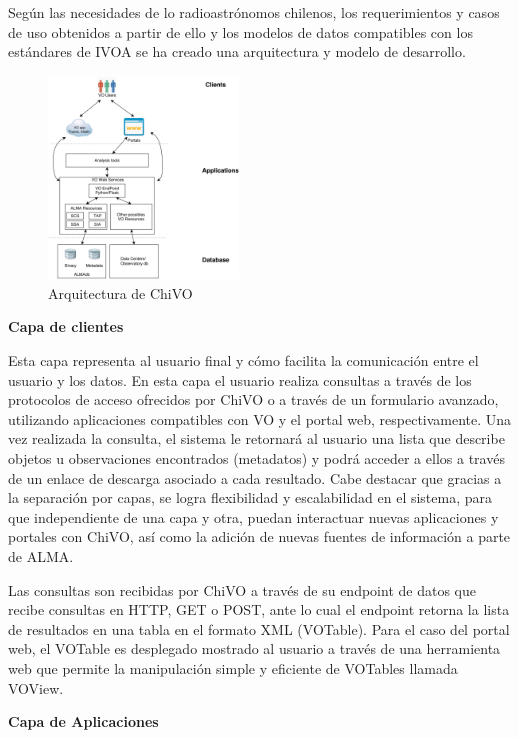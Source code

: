 Según las necesidades de lo radioastrónomos chilenos, los requerimientos y casos de
uso obtenidos a partir de ello y los modelos de datos compatibles con los estándares
de IVOA se ha creado una arquitectura y modelo de desarrollo.

\begin{figure}[h]
    \centering
    \includegraphics[width=0.45\textwidth]{images/chivo_capas.png}
    \caption{Arquitectura de ChiVO}
    \label{fig:chivoarch}
\end{figure}

\textbf{Capa de clientes}

Esta capa representa al usuario final y cómo facilita la comunicación entre el
usuario y los datos.
En esta capa el usuario realiza consultas a través de los protocolos de acceso
ofrecidos por ChiVO o a través de un formulario avanzado, utilizando aplicaciones
compatibles con VO y el portal web, respectivamente.
Una vez realizada la consulta, el sistema le retornará al usuario una lista que
describe objetos u observaciones encontrados (metadatos) y podrá acceder a ellos a
través de un enlace de descarga asociado a cada resultado.
Cabe destacar que gracias a la separación por capas, se logra flexibilidad y
escalabilidad en el sistema, para que independiente de una capa y otra, puedan
interactuar nuevas aplicaciones y portales con ChiVO, así como la adición de nuevas
fuentes de información a parte de ALMA.

Las consultas son recibidas por ChiVO a través de su endpoint de datos que recibe
consultas en HTTP, GET o POST, ante lo cual el endpoint retorna la lista de
resultados en una tabla en el formato XML (VOTable).
Para el caso del portal web, el VOTable es desplegado mostrado al usuario a través
de una herramienta web que permite la manipulación simple y eficiente de VOTables
llamada VOView.

\textbf{Capa de Aplicaciones}

